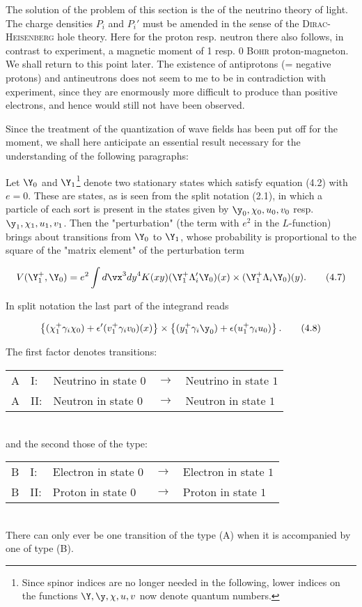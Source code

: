 \documentclass{article}
\newcommand{\nequ}[2]{
\begin{align*}
#1
\tag{#2}
\end{align*}
}
\begin{document}
The solution of the problem of this section is the  of the neutrino theory of light\cite{6}. The charge densities $P_i$ and $P_i'$ must be amended in the sense of the \textsc{Dirac-Heisenberg} hole theory\cite{3}. Here for the proton resp. neutron there also follows, in contrast to experiment, a magnetic moment of 1 resp. 0 \textsc{Bohr} proton-magneton. We shall return to this point later. The existence of antiprotons (= negative protons) and antineutrons does not seem to me to be in contradiction with experiment, since they are enormously more difficult to produce than positive electrons, and hence would still not have been observed.

Since the treatment of the quantization of wave fields has been put off for the moment, we shall here anticipate an essential result necessary for the understanding of the following paragraphs:

Let $\Y_0$ and $\Y_1$\footnote{Since spinor indices are no longer needed in the following, lower indices on the functions $\Y,\y,\chi,u,v$ now denote quantum numbers.} denote two stationary states which satisfy equation (4.2) with $e=0$. These are states, as is seen from the split notation (2.1), in which a particle of each sort is present in the states given by $\y_0,\chi_0,u_0,v_0$ resp. $\y_1,\chi_1,u_1,v_1$. Then the "perturbation" (the term with $e^2$ in the $L$-function) brings about transitions from $\Y_0$ to $\Y_1$, whose probability is proportional to the square of the "matrix element" of the perturbation term
\nequ{
V(\Y_1^+, \Y_0) = e^2 \int {d\vx}^3 {dy}^4 K(xy)
  (\Y_1^+ \Lambda_i' \Y_0)(x)\times (\Y_1^+\Lambda_i\Y_0)(y).
}{4.7}
In split notation the last part of the integrand reads
\nequ{
\left\{(\chi_1^+ \gamma_i \chi_0) + \epsilon'(v_1^+ \gamma_i v_0)(x)\right\}\times
\left\{(y_1^+ \gamma_i \y_0) + \epsilon(u_1^+ \gamma_i u_0) \right\}.
}{4.8}
The first factor denotes transitions:\\
\begin{tabular}{lllll}
A & I:  & Neutrino in state $0$ & $\to$ & Neutrino in state $1$\\
A & II: & Neutron in state $0$ & $\to$ & Neutron in state $1$\\
\end{tabular}
\\ and the second those of the type:\\
\begin{tabular}{lllll}
B & I:  & Electron in state $0$ & $\to$ & Electron in state $1$\\
B & II: & Proton in state $0$ & $\to$ & Proton in state $1$\\
\end{tabular}
\\ There can only ever be one transition of the type (A) when it is accompanied by one of type (B).
\end{document}
